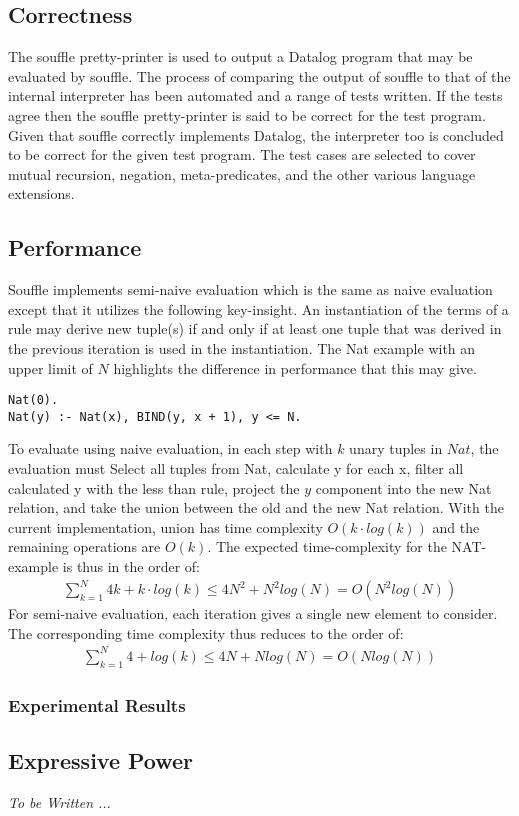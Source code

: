 \subsection{Correctness}
The souffle pretty-printer is used to output a Datalog program that may be evaluated by souffle. The process of comparing the output of souffle to that of the internal interpreter has been automated and a range of tests written. If the tests agree then the souffle pretty-printer is said to be correct for the test program. Given that souffle correctly implements Datalog, the interpreter too is concluded to be correct for the given test program. The test cases are selected to cover mutual recursion, negation, meta-predicates, and the other various language extensions.

\subsection{Performance}
Souffle implements semi-naive evaluation\cite{Green:2013:DRQ:2688167.2688168} which is the same as naive evaluation except that it utilizes the following key-insight. An instantiation of the terms of a rule may derive new tuple(s) if and only if at least one tuple that was derived in the previous iteration is used in the instantiation.
The Nat example with an upper limit of $N$ highlights the difference in performance that this may give.
\begin{verbatim}
Nat(0).
Nat(y) :- Nat(x), BIND(y, x + 1), y <= N.
\end{verbatim}
\noindent
To evaluate using naive evaluation, in each step with $k$ unary tuples in $Nat$, the evaluation must Select all tuples from Nat, calculate y for each x, filter all calculated y with the less than rule, project the $y$ component into the new Nat relation, and take the union between the old and the new Nat relation. With the current implementation, union has time complexity $O(k \cdot log(k))$ and the remaining operations are $O(k)$. The expected time-complexity for the NAT-example is thus in the order of:
\begin{align*}
\sum_{k = 1}^{N} 4 k + k \cdot log (k) \leq 4 N^2 + N^2 log(N) = O(N^2 log(N))
\end{align*}
For semi-naive evaluation, each iteration gives a single new element to consider. The corresponding time complexity thus reduces to the order of:
\begin{align*}
	\sum_{k = 1}^{N} 4 + log (k) \leq 4N + N log(N) = O(N log(N))
\end{align*}

\subsubsection{Experimental Results}

\subsection{Expressive Power}
\textit{To be Written ... }